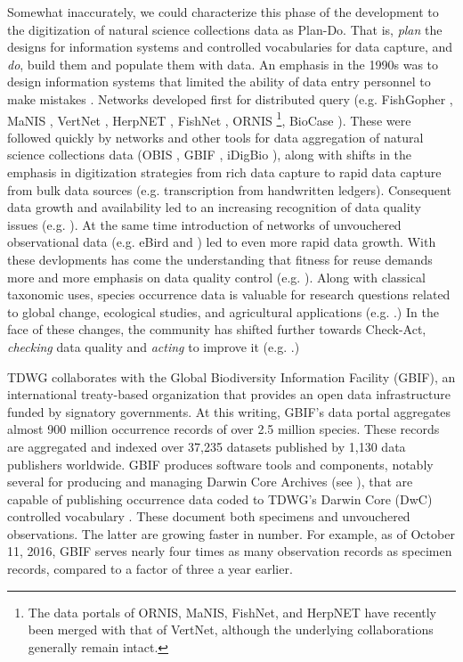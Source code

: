 \documentclass{article}
\begin{document}
Somewhat inaccurately,
we could characterize this phase of the development to the digitization of natural science collections data as Plan-Do. That is, \emph{plan} the designs for information systems and controlled vocabularies for data capture, and \emph{do}, 
build them and populate them with data.   An emphasis in the 1990s was to design information systems that limited the ability of data entry personnel to make mistakes
\citep{MorrisP2005}.  
Networks developed first for distributed query (e.g. FishGopher \citep[see][p.92]{wiley_biodiversity_2004}, MaNIS \citep{BI7, manishome_2015}, VertNet \citep{VertNetAbout}, HerpNET \citep{herpnet_2016}, FishNet \citep{fishnet_2016}, ORNIS \citep{ornis_2016}\footnote{The data portals of ORNIS, MaNIS, FishNet, and HerpNET have recently been merged with that of VertNet, although the underlying collaborations generally remain intact.}, BioCase \citep{BioCase_2015}).
These were followed quickly by networks and other tools for data aggregation of natural science collections data (OBIS \citep{OBIS2011}, GBIF \citep{GBIF2015},  iDigBio \citep{iDigBio2015}), along with shifts in the emphasis in digitization strategies from rich data capture to rapid data capture from bulk data sources (e.g. transcription from handwritten ledgers).
Consequent data growth and availability led to an increasing recognition of data quality issues (e.g. \citep{Frey200616}).
At the same time introduction of networks of unvouchered observational data (e.g. eBird  \citep{sullivan_ebird:_2009} and \citep{Ahumada2703}) led to even more rapid data growth. 
With these devlopments has come the understanding that fitness for reuse demands more and more emphasis on data quality control (e.g. \citep{chapman_principles_2005}). Along with classical taxonomic uses, species occurrence data is valuable for research questions related to global change, ecological studies, and agricultural applications (e.g. \citep{brooke_why_2000,Graham2004497}.)  In the face of these changes, the community has shifted further towards Check-Act, \emph{checking} data quality and \emph{acting} to improve it (e.g. \citep{eBirdQC}.)  

TDWG collaborates with the Global Biodiversity Information Facility (GBIF), an international treaty-based organization that provides an open data infrastructure funded by signatory governments. 
At this writing, GBIF's data portal aggregates almost 900 million occurrence records of over 2.5 million species. These records are aggregated and indexed over 37,235 datasets published by 1,130 data publishers worldwide. GBIF produces software tools and components, notably several for producing and managing Darwin Core Archives (see \citep{GBIF_DWCA}), that are capable of publishing occurrence data coded to TDWG's Darwin Core (DwC) controlled vocabulary \citep{wieczorek_darwin_2012, tdwg_darwin_2015}. 
These document both specimens and unvouchered observations. The latter are growing faster in number. For example, as of October 11, 2016, GBIF serves nearly four times as many observation records as specimen records, compared to a factor of three a year earlier.
\end{document}
